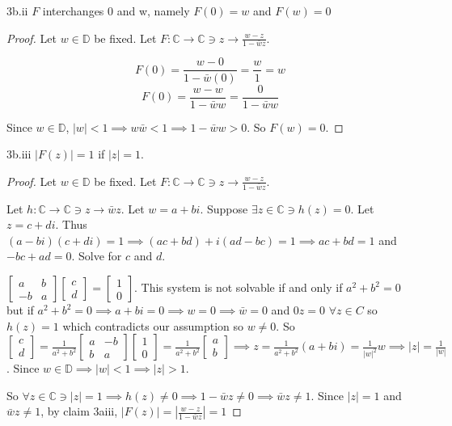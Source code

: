 \documentclass{article}
\newcommand{\C}{\mathbb{C}}
\newcommand{\abs}[1]{\left\lvert #1\right\rvert}
\begin{document}
\begin{claim}{3b.ii}\label{Claim 3bii.}
    $F$ interchanges 0 and w, namely $F(0) = w$ and $F(w) = 0$
\end{claim}
\begin{proof}
    Let $w \in \mathbb{D}$ be fixed. Let $F: \C \to \C \ni z \to \frac{w - z}{1 - \bar{w}z}$.

    \[F(0) = \frac{w - 0}{1 - \bar{w}(0)} = \frac{w}{1} = w\]
    \[F(0) = \frac{w - w}{1 - \bar{w}w} = \frac{0}{1 - \bar{w}w}\]

    Since $w \in \mathbb{D}$, $|w| < 1 \implies w\bar{w} < 1 \implies 1 - \bar{w}{w} > 0$. So $F(w) = 0$.   
\end{proof}

\begin{claim}{3b.iii}\label{Claim 3biii.}
    $|F(z)| = 1$ if $|z| = 1$.
\end{claim}
\begin{proof}
    Let $w \in \mathbb{D}$ be fixed. Let $F: \C \to \C \ni z \to \frac{w - z}{1 - \bar{w}z}$. 

    Let $h: \C \to \C \ni z \to \bar{w}z$. Let $w = a + bi$. Suppose $\exists z \in \C \ni h(z) = 0 $. Let $z = c + di$. Thus $(a - bi)(c + di) = 1 \implies (ac + bd) + i(ad - bc) = 1 \implies ac + bd = 1$ and $-bc + ad = 0$. Solve for $c$ and $d$.
    
    $\begin{bmatrix}
        a & b \\ -b & a
    \end{bmatrix}\begin{bmatrix}
        c \\ d
    \end{bmatrix} = \begin{bmatrix}
        1 \\ 0
    \end{bmatrix}$. This system is not solvable if and only if $a^2 + b^2 = 0$ but if $a^2 + b^2 = 0 \implies a + bi = 0 \implies w = 0 \implies \bar{w} = 0$ and $0z = 0$ $\forall z \in C$ so $h(z) = 1$ which contradicts our assumption so $w \neq 0$. So $\begin{bmatrix}
        c \\ d
    \end{bmatrix} = \frac{1}{a^2 + b^2}\begin{bmatrix}
        a & -b \\ b & a
    \end{bmatrix}\begin{bmatrix}
        1 \\ 0
    \end{bmatrix} = \frac{1}{a^2 + b^2} \begin{bmatrix}
        a \\ b
    \end{bmatrix} \implies z = \frac{1}{a^2 + b^2}(a + bi) = \frac{1}{|w|^2}w \implies |z| = \frac{1}{|w|}$. Since $w \in \mathbb{D} \implies |w| < 1 \implies |z| > 1$. 
    
    So $\forall z \in \C \ni |z| = 1 \implies h(z) \neq 0 \implies 1 - \bar{w}z \neq 0 \implies \bar{w}z \neq 1$. Since $|z| = 1$ and $\bar{w}z \neq 1$, by claim 3aiii, $|F(z)| = \abs{\frac{w - z}{1 - \bar{w}z}} = 1$
\end{proof}
\end{document}
